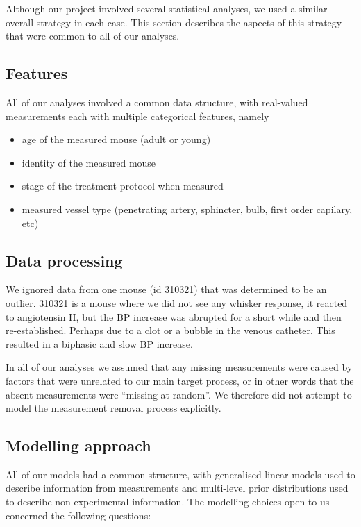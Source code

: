 \documentclass[
  letterpaper,
  DIV=11,
  numbers=noendperiod,
  oneside]{scrartcl}
\providecommand{\tightlist}{%
  \setlength{\itemsep}{0pt}\setlength{\parskip}{0pt}}\usepackage{longtable,booktabs,array}
\theoremstyle{plain}
\theoremstyle{remark}
\begin{document}
Although our project involved several statistical analyses, we used a
similar overall strategy in each case. This section describes the
aspects of this strategy that were common to all of our analyses.

\subsection{Features}\label{features}

All of our analyses involved a common data structure, with real-valued
measurements each with multiple categorical features, namely

\begin{itemize}
\tightlist
\item
  age of the measured mouse (adult or young)
\item
  identity of the measured mouse
\item
  stage of the treatment protocol when measured
\item
  measured vessel type (penetrating artery, sphincter, bulb, first order
  capilary, etc)
\end{itemize}

\subsection{Data processing}\label{data-processing}

We ignored data from one mouse (id 310321) that was determined to be an
outlier. 310321 is a mouse where we did not see any whisker response, it
reacted to angiotensin II, but the BP increase was abrupted for a short
while and then re-established. Perhaps due to a clot or a bubble in the
venous catheter. This resulted in a biphasic and slow BP increase.

In all of our analyses we assumed that any missing measurements were
caused by factors that were unrelated to our main target process, or in
other words that the absent measurements were ``missing at random''. We
therefore did not attempt to model the measurement removal process
explicitly.

\subsection{Modelling approach}\label{modelling-approach}

All of our models had a common structure, with generalised linear models
used to describe information from measurements and multi-level prior
distributions used to describe non-experimental information. The
modelling choices open to us concerned the following questions:
\end{document}
